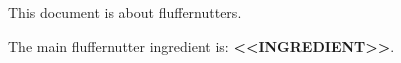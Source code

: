 \documentclass{article}
\begin{document}
This document is about fluffernutters.

The main fluffernutter ingredient is: \textbf{<<INGREDIENT>>}.
\end{document}

